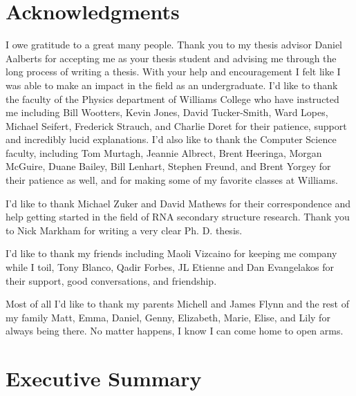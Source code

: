 % 



\section*{Acknowledgments}

I owe gratitude to a great many people. Thank you to my thesis advisor
Daniel Aalberts for accepting me as your thesis student and advising
me through the long process of writing a thesis. With your help and
encouragement I felt like I was able to make an impact in the field as
an undergraduate. I'd like to thank the faculty of the Physics
department of Williams College who have instructed me including Bill
Wootters, Kevin Jones, David Tucker-Smith, Ward Lopes, Michael
Seifert, Frederick Strauch, and Charlie Doret for their patience,
support and incredibly lucid explanations. I'd also like to thank the
Computer Science faculty, including Tom Murtagh, Jeannie Albrect,
Brent Heeringa, Morgan McGuire, Duane Bailey, Bill Lenhart, Stephen
Freund, and Brent Yorgey for their patience as well, and for making
some of my favorite classes at Williams.

I'd like to thank Michael Zuker and David Mathews for their
correspondence and help getting started in the field of RNA secondary
structure research. Thank you to Nick Markham for writing a very clear
Ph. D. thesis. 

I'd like to thank my friends including Maoli Vizcaino for keeping me
company while I toil, Tony Blanco, Qadir Forbes, JL Etienne and Dan
Evangelakos for their support, good conversations, and friendship. 

Most of all I'd like to thank my parents Michell and James Flynn and the rest of my family Matt, Emma, Daniel, Genny, Elizabeth, Marie, Elise, and Lily for always
being there. No matter happens, I know I can come home to open arms.

\newpage

\section*{Executive Summary}

